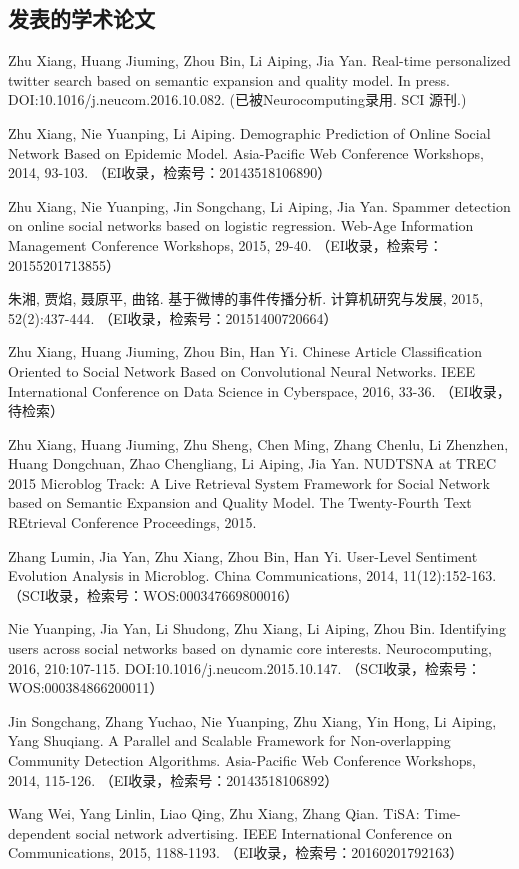 \begin{resume}

  \section*{发表的学术论文} %

  \begin{enumerate}[{[}1{]}]
  \addtolength{\itemsep}{-.36\baselineskip}%
  \item Zhu Xiang, Huang Jiuming, Zhou Bin, Li Aiping, Jia Yan. Real-time personalized twitter search based on semantic expansion and quality model. In press. DOI:10.1016/j.neucom.2016.10.082. (已被Neurocomputing录用. SCI 源刊.)
  \item Zhu Xiang, Nie Yuanping, Li Aiping. Demographic Prediction of Online Social Network Based on Epidemic Model. Asia-Pacific Web Conference Workshops, 2014, 93-103. （EI收录，检索号：20143518106890）
  \item Zhu Xiang, Nie Yuanping, Jin Songchang, Li Aiping, Jia Yan. Spammer detection on online social networks based on logistic regression. Web-Age Information Management Conference Workshops, 2015, 29-40. （EI收录，检索号：20155201713855）
  \item 朱湘, 贾焰, 聂原平, 曲铭. 基于微博的事件传播分析. 计算机研究与发展, 2015, 52(2):437-444. （EI收录，检索号：20151400720664）
  \item Zhu Xiang, Huang Jiuming, Zhou Bin, Han Yi. Chinese Article Classification Oriented to Social Network Based on Convolutional Neural Networks. IEEE International Conference on Data Science in Cyberspace, 2016, 33-36. （EI收录，待检索）
  \item Zhu Xiang, Huang Jiuming, Zhu Sheng, Chen Ming, Zhang Chenlu, Li Zhenzhen, Huang Dongchuan, Zhao Chengliang, Li Aiping, Jia Yan. NUDTSNA at TREC 2015 Microblog Track: A Live Retrieval System Framework for Social Network based on Semantic Expansion and Quality Model. The Twenty-Fourth Text REtrieval Conference Proceedings, 2015.
  \item Zhang Lumin, Jia Yan, Zhu Xiang, Zhou Bin, Han Yi.  User-Level Sentiment Evolution Analysis in Microblog. China Communications, 2014, 11(12):152-163. （SCI收录，检索号：WOS:000347669800016）
  \item Nie Yuanping, Jia Yan, Li Shudong, Zhu Xiang, Li Aiping, Zhou Bin.  Identifying users across social networks based on dynamic core interests. Neurocomputing, 2016, 210:107-115. DOI:10.1016/j.neucom.2015.10.147. （SCI收录，检索号：WOS:000384866200011）
  \item Jin Songchang, Zhang Yuchao, Nie Yuanping, Zhu Xiang, Yin Hong, Li Aiping, Yang Shuqiang. A Parallel and Scalable Framework for Non-overlapping Community Detection Algorithms. Asia-Pacific Web Conference Workshops, 2014, 115-126. （EI收录，检索号：20143518106892）
  \item Wang Wei, Yang Linlin, Liao Qing, Zhu Xiang, Zhang Qian. TiSA: Time-dependent social network advertising. IEEE International Conference on Communications, 2015, 1188-1193. （EI收录，检索号：20160201792163）
  \end{enumerate}


\end{resume}

